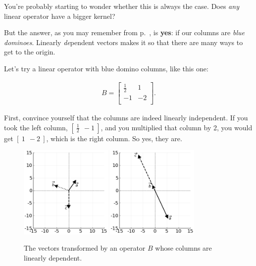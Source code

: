 You're probably starting to wonder whether this is always the case. Does
\textit{any} linear operator have a bigger kernel?

But the answer, as you may remember from p.~\pageref{trivialSolution}, is
\textbf{yes}: if our columns are \textit{blue dominoes}. Linearly
\textit{de}pendent vectors makes it so that there are many ways to get to the
origin.

Let's try a linear operator with blue domino columns, like this one:

\vspace{-.15in}
\begin{align*}
B =
\begin{bmatrix}
\frac{1}{2} & 1 \\
-1 & -2 \\
\end{bmatrix}.
\end{align*}
\vspace{-.15in}

First, convince yourself that the columns are indeed linearly independent. If
you took the left column, $[\ \frac{1}{2} \ \ -1\ ]$, and you multiplied that
column by 2, you would get $[\ 1\ \ -2\ ]$, which is the right column. So yes,
they are.

\begin{figure}[ht]
\centering
\includegraphics[width=0.40\textwidth]{preoperators.png}
\includegraphics[width=0.40\textwidth]{bluedominoesop.png}
\caption[.]{The vectors transformed by an operator $B$ whose columns are
linearly dependent.}
\label{fig:bluedominoesop}
\end{figure}

